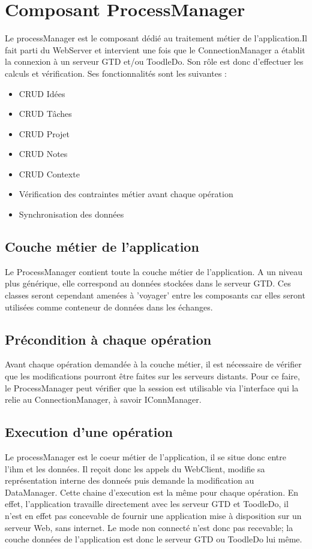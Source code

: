 \section{Composant ProcessManager}

Le processManager est le composant dédié au traitement métier de
l'application.Il fait parti du WebServer et intervient une fois que le
 ConnectionManager a établit la connexion à un serveur GTD et/ou ToodleDo.
Son rôle est donc d'effectuer les calculs et vérification. Ses fonctionnalités
sont les suivantes :\\
\begin{itemize}
  \item CRUD Idées
  \item CRUD Tâches
  \item CRUD Projet
  \item CRUD Notes
  \item CRUD Contexte
  \item Vérification des contraintes métier avant chaque opération
  \item Synchronisation des données
\end{itemize}


\subsection*{Couche métier de l'application}
Le ProcessManager contient toute la couche métier de l'application. A un niveau
plus générique, elle correspond au données stockées dans le serveur GTD. Ces
classes seront cependant amenées à 'voyager' entre les composants car elles
seront utilisées comme conteneur de données dans les échanges.

    
\subsection*{Précondition à chaque opération}
Avant chaque opération demandée à la couche métier, il est nécessaire de
vérifier que les modifications pourront être faites sur les serveurs distants.
Pour ce faire, le ProcessManager peut vérifier que la session est utilisable
via l'interface qui la relie au ConnectionManager, à savoir IConnManager.

\subsection*{Execution d'une opération}
Le processManager est le coeur métier de l'application, il se situe donc entre
l'ihm et les données. Il reçoit donc les appels du WebClient, modifie sa
représentation interne des donneés puis demande la modification au DataManager.
Cette chaine d'execution est la même pour chaque opération. En effet,
l'application travaille directement avec les serveur GTD et ToodleDo, il n'est
en effet pas concevable de fournir une application mise à disposition sur un
serveur Web, sans internet. Le mode non connecté n'est donc pas recevable; la
couche données de l'application est donc le serveur GTD ou ToodleDo lui même.

